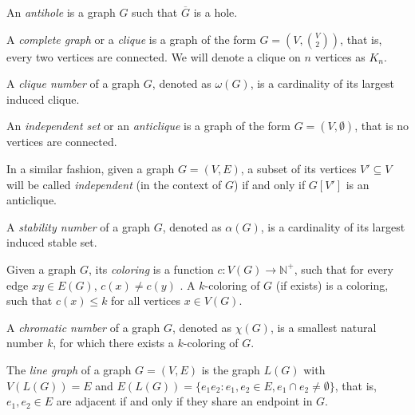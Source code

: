 \begin{defn}[antihole]
  An \emph{antihole} is a graph $G$ such that $\overline{G}$ is a hole.
\end{defn}

\begin{defn}[clique]
  A \emph{complete graph} or a \emph{clique} is a graph of the form $G = (V, {V \choose 2})$, that is, every two vertices are connected. We will denote a clique on $n$ vertices as $K_n$.
\end{defn}

\begin{defn}
  A \emph{clique number} of a graph $G$, denoted as $\omega(G)$, is a cardinality of its largest induced clique.
\end{defn}

\begin{defn}[anticlique]
  An \emph{independent set} or an \emph{anticlique} is a graph of the form $G = (V, \emptyset)$, that is no vertices are connected.
\end{defn}
In a similar fashion, given a graph $G = (V, E)$, a subset of its vertices $V' \subseteq V$ will be called \emph{independent} (in the context of $G$) if and only if $G[V']$ is an anticlique.

\begin{defn}
  A \emph{stability number} of a graph $G$, denoted as $\alpha(G)$, is a cardinality of its largest induced stable set.
\end{defn}

\begin{defn}[coloring]
  Given a graph $G$, its \emph{coloring} is a function $c: V(G) \rightarrow \mathbb{N}^+$, such that for every edge $xy \in E(G)$, $c(x) \neq c(y)$ . A $k$-coloring of $G$ (if exists) is a coloring, such that $c(x) \leq k$ for all vertices $x \in V(G)$.
\end{defn}

\begin{defn}
  A \emph{chromatic number} of a graph $G$, denoted as $\chi(G)$, is a smallest natural number $k$, for which there exists a $k$-coloring of $G$.
\end{defn}

\begin{defn}
  The \emph{line graph} of a graph $G = (V, E)$ is the graph $L(G)$ with $V(L(G)) = E$ and $E(L(G)) = \{e_1 e_2: e_1, e_2 \in E, e_1 \cap e_2 \neq \emptyset\}$, that is, $e_1, e_2 \in E$ are adjacent if and only if they share an endpoint in $G$.
\end{defn}


